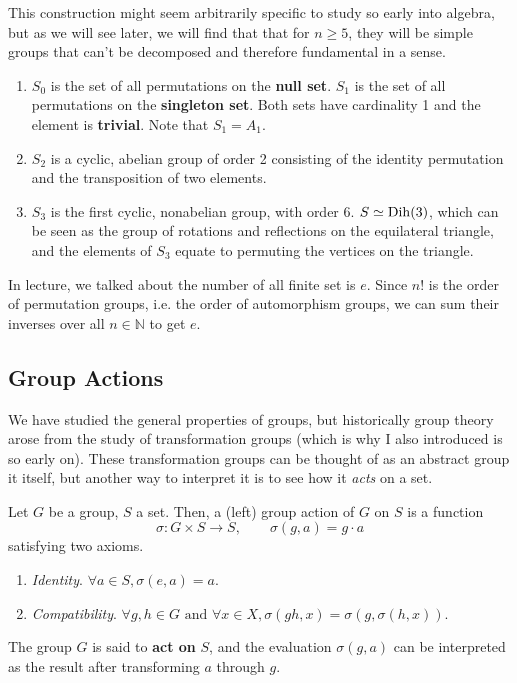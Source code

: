   This construction might seem arbitrarily specific to study so early into algebra, but as we will see later, we will find that that for $n \geq 5$, they will be simple groups that can't be decomposed and therefore fundamental in a sense. 

  \begin{example}
    \begin{enumerate}
      \item $S_{0}$ is the set of all permutations on the \textbf{null set}. $S_{1}$ is the set of all permutations on the \textbf{singleton set}. Both sets have cardinality 1 and the element is \textbf{trivial}. Note that $S_{1} = A_{1}$. 
      \item $S_{2}$ is a cyclic, abelian group of order 2 consisting of the identity permutation and the transposition of two elements. 
      \item $S_{3}$ is the first cyclic, nonabelian group, with order 6. $S \simeq \Dih(3)$, which can be seen as the group of rotations and reflections on the equilateral triangle, and the elements of $S_{3}$ equate to permuting the vertices on the triangle. 
    \end{enumerate}
  \end{example}

  In lecture, we talked about the number of all finite set is $e$. Since $n!$ is the order of permutation groups, i.e. the order of automorphism groups, we can sum their inverses over all $n \in \mathbb{N}$ to get $e$.  

\subsection{Group Actions} 

  We have studied the general properties of groups, but historically group theory arose from the study of transformation groups (which is why I also introduced is so early on). These transformation groups can be thought of as an abstract group it itself, but another way to interpret it is to see how it \textit{acts} on a set. 

  \begin{definition}
    Let $G$ be a group, $S$ a set. Then, a (left) group action of $G$ on $S$ is a function
    \begin{equation}
      \sigma: G \times S \to S, \qquad \sigma(g, a) = g \cdot a 
    \end{equation}
    satisfying two axioms. 
    \begin{enumerate}
      \item \textit{Identity}. $\forall a \in S, \sigma(e, a) = a$. 
      \item \textit{Compatibility}. $\forall g, h \in G \text{ and } \forall x \in X, \sigma(gh, x) = \sigma(g, \sigma(h, x))$.
    \end{enumerate}
    The group $G$ is said to \textbf{act on} $S$, and the evaluation $\sigma(g, a)$ can be interpreted as the result after transforming $a$ through $g$. 
  \end{definition}
  
